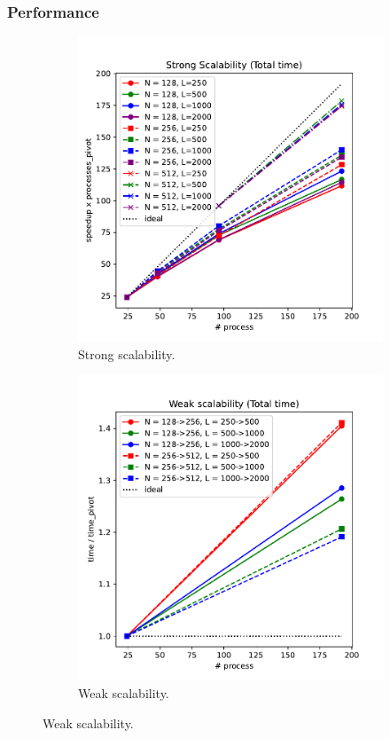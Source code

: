 \documentclass{beamer}
\makeatletter
\newcommand{\mylabel}{%
}
\makeatother
\begin{document}
\begin{frame}[label=performancescaling]
 \frametitle{Performance\mylabel}
  \vspace*{-.5cm}
  \begin{figure}
      \begin{subfigure}[b]{.49\textwidth}
      \includegraphics[width=\textwidth]{images/appendix/strong-scale-Total.pdf}%
      \caption{Strong scalability.}
      \end{subfigure}
      \begin{subfigure}[b]{.49\textwidth}
      \includegraphics[width=\textwidth]{images/appendix/weak-scale-Total.pdf}%
      \caption{Weak scalability.}
      \end{subfigure}
  \end{figure}
\end{frame}
\end{document}
